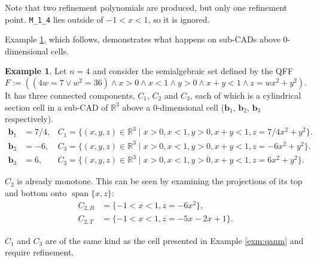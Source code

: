 \documentclass[
]{book}
\theoremstyle{definition}
\theoremstyle{definition}
\newtheorem{example}{Example}[chapter]
\theoremstyle{definition}
\theoremstyle{definition}
\theoremstyle{remark}
\begin{document}
Note that two refinement polynomials are produced, but only one refinement point. \texttt{M\_1\_4} lies outside of \(-1 < x < 1\), so it is ignored.

Example \ref{exm:qanm-4-rat}, which follows, demonstrates what happens on sub-CADs above 0-dimensional cells.

\begin{example}
\protect\hypertarget{exm:qanm-4-rat}{}\label{exm:qanm-4-rat}Let \(n = 4\) and consider the semialgebraic set defined by the QFF
\[
F := ( ( 4 w = 7 \lor w^2 = 36 ) \land x > 0 \land x < 1 \land y > 0 \land x + y < 1 \land z = w x^2 + y^2 ).
\]
It has three connected components, \(C_1\), \(C_2\) and \(C_3\), each of which is a cylindrical section cell in a sub-CAD of \(\mathbb{R}^3\) above a \(0\)-dimensional cell (\(\mathbf{b}_1\), \(\mathbf{b}_2\), \(\mathbf{b}_3\) respectively).
\begin{align}
\mathbf{b}_1 &= 7/4, &C_1 = \{ (x,y,z) \in \mathbb{R}^3 \mid x > 0 ,x < 1 ,y > 0 ,x + y < 1 ,z = 7/4 x^2 + y^2 \}.\\
\mathbf{b}_2 &= -6, &C_3 = \{ (x,y,z) \in \mathbb{R}^3 \mid x > 0 ,x < 1 ,y > 0 ,x + y < 1 ,z = -6 x^2 + y^2 \}.\\
\mathbf{b}_3 &= 6, &C_3 = \{ (x,y,z) \in \mathbb{R}^3 \mid x > 0 ,x < 1 ,y > 0 ,x + y < 1 ,z = 6 x^2 + y^2 \}.
\end{align}

\(C_2\) is already monotone. This can be seen by examining the projections of its top and bottom onto \({\operatorname{span} \{x,z\}}\):
\begin{align}
C_{2,B} &= \{ -1 < x < 1, z = -6x^2 \},\\
C_{2,T} &= \{ -1 < x < 1, z = -5x - 2x + 1 \}.
\end{align}

\(C_1\) and \(C_3\) are of the same kind as the cell presented in Example \ref{exm:qanm} and require refinement.
\end{example}
\end{document}
